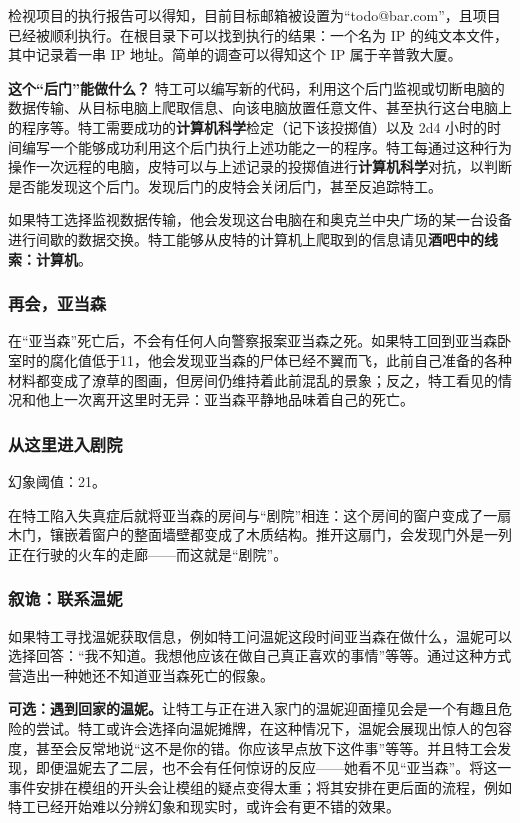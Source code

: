 检视项目的执行报告可以得知，目前目标邮箱被设置为“todo@bar.com”，且项目已经被顺利执行。在根目录下可以找到执行的结果：一个名为 IP 的纯文本文件，其中记录着一串 IP 地址。简单的调查可以得知这个 IP 属于辛普敦大厦。

\textbf{这个“后门”能做什么？} 特工可以编写新的代码，利用这个后门监视或切断电脑的数据传输、从目标电脑上爬取信息、向该电脑放置任意文件、甚至执行这台电脑上的程序等。特工需要成功的\textbf{计算机科学}检定（记下该投掷值）以及 2d4 小时的时间编写一个能够成功利用这个后门执行上述功能之一的程序。特工每通过这种行为操作一次远程的电脑，皮特可以与上述记录的投掷值进行\textbf{计算机科学}对抗，以判断是否能发现这个后门。发现后门的皮特会关闭后门，甚至反追踪特工。

如果特工选择监视数据传输，他会发现这台电脑在和奥克兰中央广场的某一台设备进行间歇的数据交换。特工能够从皮特的计算机上爬取到的信息请见\textbf{酒吧中的线索：计算机}。

\subsubsection{再会，亚当森}
在“亚当森”死亡后，不会有任何人向警察报案亚当森之死。如果特工回到亚当森卧室时的腐化值低于11，他会发现亚当森的尸体已经不翼而飞，此前自己准备的各种材料都变成了潦草的图画，但房间仍维持着此前混乱的景象；反之，特工看见的情况和他上一次离开这里时无异：亚当森平静地品味着自己的死亡。

\subsubsection{从这里进入剧院}
幻象阈值：21。

在特工陷入失真症后就将亚当森的房间与“剧院”相连：这个房间的窗户变成了一扇木门，镶嵌着窗户的整面墙壁都变成了木质结构。推开这扇门，会发现门外是一列正在行驶的火车的走廊——而这就是“剧院”。

\subsubsection{叙诡：联系温妮}
如果特工寻找温妮获取信息，例如特工问温妮这段时间亚当森在做什么，温妮可以选择回答：“我不知道。我想他应该在做自己真正喜欢的事情”等等。通过这种方式营造出一种她还不知道亚当森死亡的假象。

\textbf{可选：遇到回家的温妮。}让特工与正在进入家门的温妮迎面撞见会是一个有趣且危险的尝试。特工或许会选择向温妮摊牌，在这种情况下，温妮会展现出惊人的包容度，甚至会反常地说“这不是你的错。你应该早点放下这件事”等等。并且特工会发现，即便温妮去了二层，也不会有任何惊讶的反应——她看不见“亚当森”。将这一事件安排在模组的开头会让模组的疑点变得太重；将其安排在更后面的流程，例如特工已经开始难以分辨幻象和现实时，或许会有更不错的效果。
